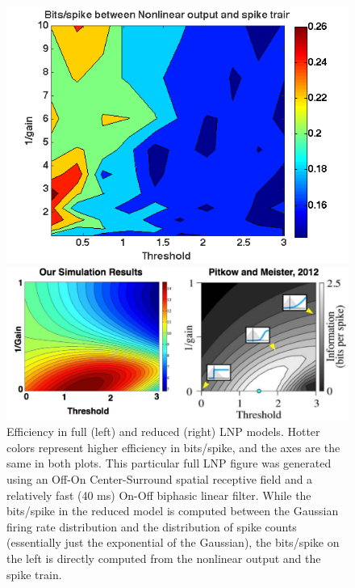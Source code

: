 \documentclass[12pt]{article}
\begin{document}
\begin{figure}[h!!]
\centering
\begin{minipage}[b]{0.48\linewidth}
\centering
\includegraphics[width=\textwidth]{4f_contour_LNPsimulation_OFFcell.png}
\end{minipage}
\begin{minipage}[b]{0.48\linewidth}
\centering
\includegraphics[scale=0.36]{ReplicationOf4f_justOurs.pdf}
\end{minipage}
\caption{Efficiency in full (left) and reduced (right) LNP models.  Hotter colors represent higher efficiency in bits/spike, and the axes are the same in both plots.  This particular full LNP figure was generated using an Off-On Center-Surround spatial receptive field and a relatively fast (40 ms) On-Off biphasic linear filter.  While the bits/spike in the reduced model is computed between the Gaussian firing rate distribution and the distribution of spike counts (essentially just the exponential of the Gaussian), the bits/spike on the left is directly computed from the nonlinear output and the spike train.}
\label{Figure 7}
\end{figure}
\end{document}
